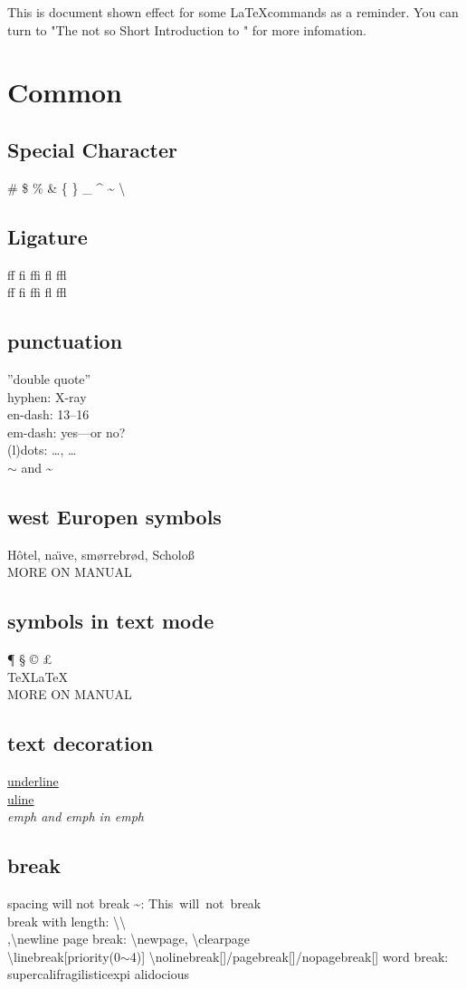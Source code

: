 \documentclass{article}
\begin{document}
This is document shown effect for some \LaTeX commands as a reminder. You can turn to "The not so Short Introduction to \LaTeXe" for more infomation.
\section{Common}
\subsection{Special Character}
    \# \$ \% \& \{ \} \_ \^{} \~{} \textbackslash
\subsection{Ligature}
    f{}f f{}i f{}f{}i f{}l f{}f{}l\\
    ff fi ffi fl ffl
\subsection{punctuation}
    ''double quote''\\
    hyphen: X-ray\\
    en-dash: 13--16\\
    em-dash: yes---or no?\\
    (l)dots: \ldots, \dots\\
    $\sim$ and \~{}
\subsection{west Europen symbols}
    H\^otel, na\"\i ve, sm\o rrebr\o d, Scholo\ss{}\\
    MORE ON MANUAL
\subsection{symbols in text mode}
    \P{} \S{} \dag{} \ddag{} \copyright{} \pounds{}
    \textasteriskcentered *
    \textperiodcentered
    \textbullet
    \textregistered{} \texttrademark\\
    \TeX \LaTeX \LaTeXe\\
    MORE ON MANUAL
\subsection{text decoration}
    \underline{underline}\\
    \uline{uline}\\
    \emph{emph and \emph{emph in emph}}
\subsection{break}
    spacing will not break \~{}: This~will~not~break\\
    break with length: \textbackslash\textbackslash\\[1cm],\textbackslash newline
    page break: \textbackslash newpage, \textbackslash clearpage\\
    \textbackslash linebreak[priority(0$\sim$4)] \linebreak[4]
    \textbackslash nolinebreak[]/pagebreak[]/nopagebreak[]
    word break: su\-per\-cal\-ifragilistic\-expi\-%
    al\-i\-do\-cious
\end{document}
